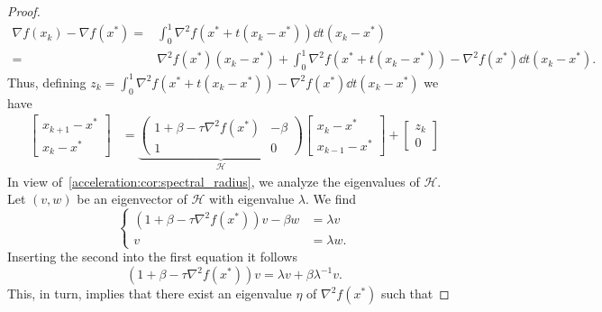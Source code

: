 \begin{proof}
\begin{equation}
        \begin{aligned}
            \nabla f(x_k) - \nabla f(x^*) 
            =& \int_0^1 \nabla^2 f(x^* + t(x_k-x^*))\dd t (x_k-x^*)\\
            =& \nabla^2 f(x^*)(x_k-x^*) + \int_0^1 \nabla^2 f(x^* + t(x_k-x^*))-\nabla^2 f(x^*)\dd t (x_k-x^*).
        \end{aligned}
    \end{equation}
    Thus, defining $z_k = \int_0^1 \nabla^2 f(x^* + t(x_k-x^*))-\nabla^2 f(x^*)\dd t (x_k-x^*)$ we have
    \begin{equation}
        \begin{aligned}
            \begin{bmatrix}
                x_{k+1}-x^*\\
                x_k-x^*
            \end{bmatrix}
            &=
            \underbrace{\begin{pmatrix}
                1+\beta - \tau \nabla^2 f(x^*)&-\beta\\
                1&0
            \end{pmatrix}}_{\mathcal{H}}
            \begin{bmatrix}
                x_k-x^*\\
                x_{k-1}-x^*
            \end{bmatrix}
            + \begin{bmatrix}
                z_k\\
                0
            \end{bmatrix}
        \end{aligned}
    \end{equation}
    In view of~\cref{acceleration:cor:spectral_radius}, we analyze the eigenvalues of $\mathcal{H}$. Let $(v,w)$ be an eigenvector of $\mathcal{H}$ with eigenvalue $\lambda$. We find
    \begin{equation}
        \begin{cases}
            (1+\beta -\tau \nabla^2 f(x^*))v - \beta w &= \lambda v\\
            v &= \lambda w.
        \end{cases}
    \end{equation}
    Inserting the second into the first equation it follows
    \begin{equation}
        (1+\beta -\tau \nabla^2 f(x^*))v = \lambda v + \beta\lambda^{-1} v.
    \end{equation}
    This, in turn, implies that there exist an eigenvalue $\eta$ of $\nabla^2f(x^*)$ such that

\end{proof}
